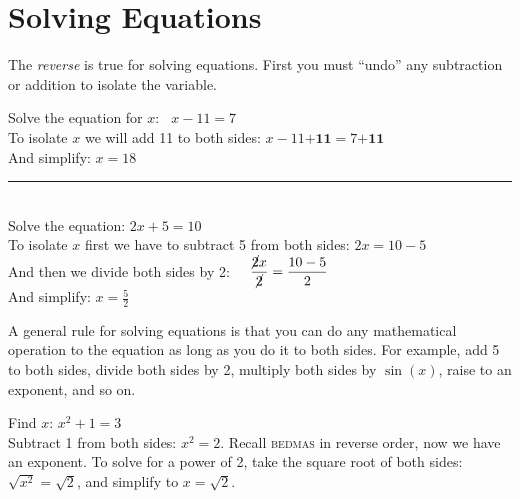 \section*{Solving Equations}
The \textit{reverse} is true for solving equations. First you must ``undo'' any subtraction or addition to isolate the variable.

\example Solve the equation for $x$: $\phantom{a}x-11=7$\medskip\\
\solution To isolate $x$ we will add 11 to both sides: $x-11\textbf{+11}=7\textbf{+11}$\\
And simplify: $x=18$\\
\rule{6.8cm}{0.5pt}\\
\example Solve the equation: $2x+5=10$\medskip\\
\solution To isolate $x$ first we have to subtract 5 from both sides: $2x=10-5$\\
And then we divide both sides by 2: $\displaystyle\phantom{aa}\frac{\cancel{2}x}{\cancel{2}}=\frac{10-5}{2}$\\
And simplify: $\displaystyle x=\frac{5}{2}$

\begin{tcolorbox}
A general rule for solving equations is that you can do any mathematical operation to the equation as long as you do it to both sides. For example, add 5 to both sides, divide both sides by 2, multiply both sides by $\sin(x)$, raise to an exponent, and so on.
\end{tcolorbox}
\example Find $x$: $x^2+1=3$\medskip\\
\solution Subtract 1 from both sides: $x^2=2$. Recall \textsc{bedmas} in reverse order, now we have an exponent. To solve for a power of 2, take the square root of both sides: $\sqrt{x^2}=\sqrt{2}$, and simplify to $x=\sqrt{2}$.
